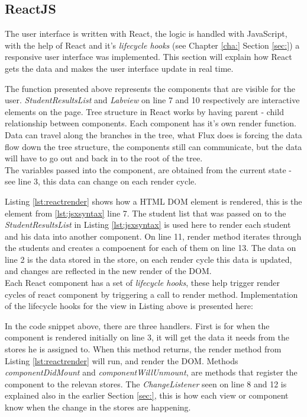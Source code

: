\subsection{ReactJS}\label{sec:reactjs}
The user interface is written with React, the logic is handled with JavaScript, with the help of React and it's \emph{lifecycle hooks} (see Chapter \ref{cha:} Section \ref{sec:})  a responsive user interface was implemented. This section will explain how React gets the data and makes the user interface update in real time.

The function presented above represents the components that are visible for the user. \emph{StudentResultsList} and \emph{Labview} on line 7 and 10 respectively are interactive elements on the page. Tree structure in React works by having parent - child relationship between components. Each component has it's own render function. Data can travel along the branches in the tree, what Flux does is forcing the data flow down the tree structure, the components still can communicate, but the data will have to go out and back in to the root of the tree.
\\The variables passed into the component, are obtained from the current state - see line 3, this data can change on each render cycle.

Listing \ref{lst:reactrender} shows how a HTML DOM element is rendered, this is the element from \ref{lst:jsxsyntax} line 7. The student list that was passed on to the \emph{StudentResultsList} in Listing \ref{lst:jsxsyntax} is used here to render each student and his data into another component. On line 11, render method iterates through the students and creates a compoenent for each of them on line 13. The data on line 2 is the data stored in the store, on each render cycle this data is updated, and changes are reflected in the new render of the DOM.
\\Each React component has a set of \emph{lifecycle hooks}, these help trigger render cycles of react component by triggering a call to render method. Implementation of the lifecycle hooks for the view in Listing above is presented here:

In the code snippet above, there are three handlers. First is for when the component is rendered initially on line 3, it will get the data it needs from the stores he is assigned to. When this method returns, the render method from Listing \ref{lst:reactrender} will run, and render the DOM. Methods \emph{componentDidMount} and \emph{componentWillUnmount}, are methods that register the component to the relevan stores. The \emph{ChangeListener} seen on line 8 and 12 is explained also in the earlier Section \ref{sec:}, this is how each view or component know when the change in the stores are happening.
